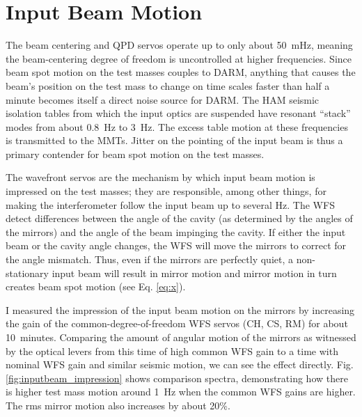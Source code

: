 \section{Input Beam Motion}
The beam centering and QPD servos operate up to only about 50~mHz,
meaning the beam-centering degree of freedom is uncontrolled at higher
frequencies. Since beam spot motion on the test masses couples to
DARM, anything that causes the beam's position on the test mass to
change on time scales faster than half a minute becomes itself a
direct noise source for DARM. The HAM seismic isolation tables from
which the input optics are suspended have resonant ``stack'' modes
from about 0.8~Hz to 3~Hz. The excess table motion at these
frequencies is transmitted to the MMTs. Jitter on the pointing of the
input beam is thus a primary contender for beam spot motion on the
test masses.


The wavefront servos are the mechanism by which input beam motion is
impressed on the test masses; they are responsible, among other
things, for making the interferometer follow the input beam up to
several Hz. The WFS detect differences between the angle of the cavity
(as determined by the angles of the mirrors) and the angle of the beam
impinging the cavity. If either the input beam or the cavity angle
changes, the WFS will move the mirrors to correct for the angle
mismatch. Thus, even if the mirrors are perfectly quiet, a
non-stationary input beam will result in mirror motion and mirror
motion in turn creates beam spot motion (see Eq. \ref{eq:x}).

I measured the impression of the input beam motion on the mirrors by
increasing the gain of the common-degree-of-freedom WFS servos (CH,
CS, RM) for about 10~minutes. Comparing the amount of angular motion
of the mirrors as witnessed by the optical levers from this time of
high common WFS gain to a time with nominal WFS gain and similar
seismic motion, we can see the effect
directly. Fig. \ref{fig:inputbeam_impression} shows comparison
spectra, demonstrating how there is higher test mass motion around
1~Hz when the common WFS gains are higher. The rms mirror motion also
increases by about 20\%.

